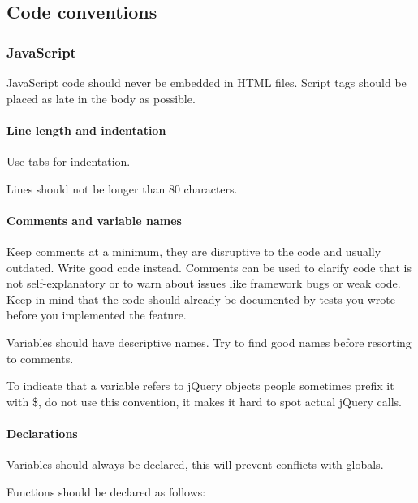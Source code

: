 \subsection{Code conventions}

\subsubsection{JavaScript} \hspace{1mm}

JavaScript code should never be embedded in HTML files. Script tags should be
placed as late in the body as possible. \cite{crockford:code}

\paragraph{Line length and indentation} \hspace{1mm}

Use tabs for indentation. 

Lines should not be longer than 80 characters.

\paragraph{Comments and variable names} \hspace{1mm}

Keep comments at a minimum, they are disruptive to the code and
usually outdated. Write good code instead. Comments can be used to
clarify code that is not self-explanatory or to warn about issues like
framework bugs or weak code. Keep in mind that the code should already
be documented by tests you wrote before you implemented the feature.

Variables should have descriptive names. Try to find good names before
resorting to comments.

To indicate that a variable refers to jQuery objects people sometimes
prefix it with \$, do not use this convention, it makes it hard to
spot actual jQuery calls.

\paragraph{Declarations} \hspace{1mm}

Variables should always be declared, this will prevent conflicts with globals.

Functions should be declared as follows:

